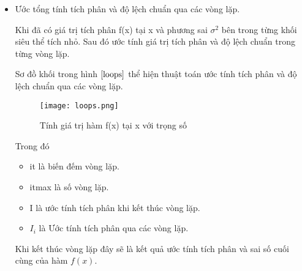 \begin{itemize}
\item Ước tổng tính tích phân và độ lệch chuẩn qua các vòng lặp.\par
Khi đã có giá trị tích phân f(x) tại x và phương sai $\sigma^2$ bên trong từng khối siêu thể tích nhỏ.
Sau đó ước tính giá trị tích phân và độ lệch chuẩn trong từng vòng lặp.  \par
Sơ đồ khối trong hình $ \ref{loops} $ thể hiện thuật toán ước tính tích phân và độ lệch chuẩn qua các vòng lặp.
\begin{figure}[H]
      \centering
      \texttt{[image: loops.png]}
      \caption{Tính giá trị hàm f(x) tại x với trọng số }\label{loops}
\end{figure}
Trong đó
\begin{itemize}
      \item it là biến đếm vòng lặp.
      \item itmax là số vòng lặp.
      \item I là ước tính tích phân khi kết thúc vòng lặp.
      \item $I_i$ là Ước tính tích phân qua các vòng lặp.
\end{itemize}
Khi kết thúc vòng lặp đây sẽ là kết quả ước tính tích phân và sai số cuối cùng của hàm $f(x)$.
\end{itemize}



